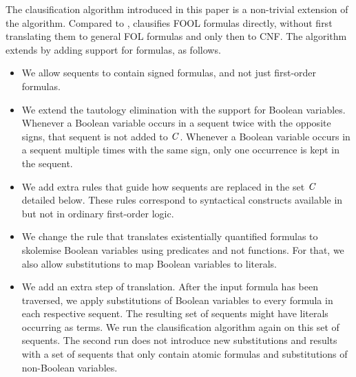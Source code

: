 The \nfcnf{} clausification algorithm introduced in this paper is a non-trivial extension of the \newcnf{} algorithm. 
Compared to \oldcnf{}, %
\nfcnf{} 
clausifies FOOL formulas directly, without first translating them to general FOL formulas and only then to CNF. 
The \nfcnf{} algorithm   extends \newcnf{} by adding support for \folb{} formulas, as follows. 
\begin{itemize}
  \item We allow sequents to contain signed \folb{} formulas, and not just first-order formulas.
  \item We extend the \newcnf{} tautology elimination with the support for Boolean variables. Whenever a Boolean variable occurs in a sequent twice with the opposite signs, that sequent is not added to $\mathit{C}$. Whenever a Boolean variable occurs in a sequent multiple times with the same sign, only one occurrence is kept in the sequent.
  \item We add extra rules that guide how sequents are replaced in the set $\mathit{C}$ detailed below. These rules correspond to syntactical constructs available in \folb{} but not in ordinary first-order logic.
  \item We change the rule that translates existentially quantified formulas to sko\-le\-mi\-se Boolean variables using \Skolem{} predicates and not \Skolem{} functions. For that, we also allow substitutions to map Boolean variables to \Skolem{} literals. 
  \item We add an extra step of translation. After the input formula has been traversed, we apply substitutions of Boolean variables to every formula in each respective sequent. The resulting set of sequents might have \Skolem{} literals occurring as terms. We run the clausification algorithm again on this set of sequents. The second run does not introduce new substitutions and results with a set of sequents that only contain atomic formulas and substitutions of non-Boolean variables.
\end{itemize}

